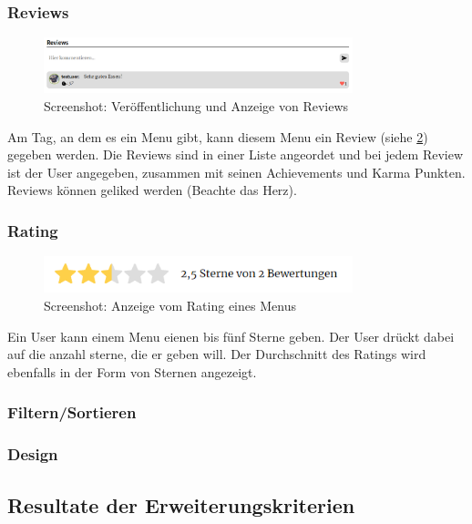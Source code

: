 \subsubsection*{Reviews}

\begin{figure}[ht]
    \centering
    \includegraphics[width=0.8\textwidth]{images/Resultat_Review.png}
    \caption{Screenshot: Veröffentlichung und Anzeige von Reviews}
    \label{fig:r-review}
\end{figure}

Am Tag, an dem es ein Menu gibt, kann diesem Menu ein Review (siehe \ref{fig:r-review}) gegeben werden. Die
Reviews sind in einer Liste angeordet und bei jedem Review ist der User
angegeben, zusammen mit seinen Achievements und Karma Punkten. Reviews können
geliked werden (Beachte das Herz).


\subsubsection*{Rating}

\begin{figure}[ht]
    \centering
    \includegraphics[width=0.8\textwidth]{images/Resultat_Rating.png}
    \caption{Screenshot: Anzeige vom Rating eines Menus}
    \label{fig:r-review}
\end{figure}

Ein User kann einem Menu eienen bis fünf Sterne geben. Der User drückt dabei auf
die anzahl sterne, die er geben will. Der Durchschnitt des Ratings wird
ebenfalls in der Form von Sternen angezeigt. 

\subsubsection*{Filtern/Sortieren}
\subsubsection*{Design}

\subsection{Resultate der Erweiterungskriterien}

